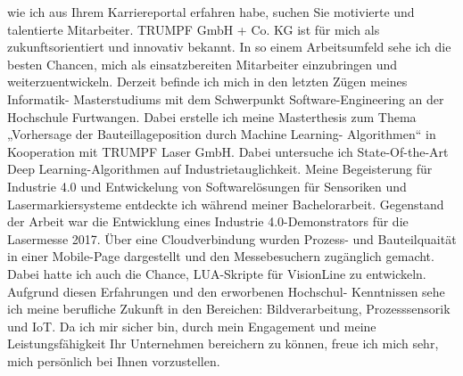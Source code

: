 \documentclass{ReCeiVe}         %
\begin{document}
\makecvheader[L]
\makelettertitle[R]

\begin{cvletter}
wie ich aus Ihrem Karriereportal erfahren habe, suchen Sie motivierte
und talentierte Mitarbeiter. TRUMPF GmbH + Co. KG ist für mich als
zukunftsorientiert und innovativ bekannt. In so einem Arbeitsumfeld
sehe ich die besten Chancen, mich als einsatzbereiten Mitarbeiter
einzubringen und weiterzuentwickeln.
Derzeit befinde ich mich in den letzten Zügen meines Informatik-
Masterstudiums mit dem Schwerpunkt Software-Engineering an der
Hochschule Furtwangen. Dabei erstelle ich meine Masterthesis zum
Thema „Vorhersage der Bauteillageposition durch Machine Learning-
Algorithmen“ in Kooperation mit TRUMPF Laser GmbH. Dabei
untersuche ich State-Of-the-Art Deep Learning-Algorithmen auf
Industrietauglichkeit.
Meine Begeisterung für Industrie 4.0 und Entwickelung von
Softwarelösungen für Sensoriken und Lasermarkiersysteme entdeckte
ich während meiner Bachelorarbeit. Gegenstand der Arbeit war die
Entwicklung eines Industrie 4.0-Demonstrators für die Lasermesse
2017. Über eine Cloudverbindung wurden Prozess- und Bauteilquaität
in einer Mobile-Page dargestellt und den Messebesuchern zugänglich
gemacht. Dabei hatte ich auch die Chance, LUA-Skripte für VisionLine
zu entwickeln.
Aufgrund diesen Erfahrungen und den erworbenen Hochschul-
Kenntnissen sehe ich meine berufliche Zukunft in den Bereichen:
Bildverarbeitung, Prozesssensorik und IoT. Da ich mir sicher bin,
durch mein Engagement und meine Leistungsfähigkeit Ihr
Unternehmen bereichern zu können, freue ich mich sehr, mich
persönlich bei Ihnen vorzustellen. \par\bigskip
\end{cvletter}

\makeletterclosing %
\end{document}
